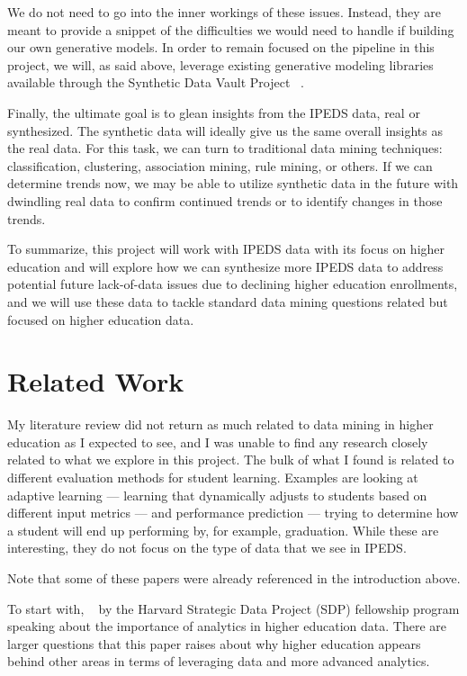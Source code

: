\documentclass[sigconf, authorversion, nonacm]{acmart}
\begin{document}
    We do not need to go into the inner workings of these issues. Instead, they are meant to provide a snippet of the difficulties we would need to handle if building our own generative models. In order to remain focused on the pipeline in this project, we will, as said above, leverage existing generative modeling libraries available through the Synthetic Data Vault Project ~\cite{sdv}.

    Finally, the ultimate goal is to glean insights from the IPEDS data, real or synthesized. The synthetic data will ideally give us the same overall insights as the real data. For this task, we can turn to traditional data mining techniques: classification, clustering, association mining, rule mining, or others. If we can determine trends now, we may be able to utilize synthetic data in the future with dwindling real data to confirm continued trends or to identify changes in those trends.

    To summarize, this project will work with IPEDS data with its focus on higher education and will explore how we can synthesize more IPEDS data to address potential future lack-of-data issues due to declining higher education enrollments, and we will use these data to tackle standard data mining questions related but focused on higher education data.

\section{Related Work}
    My literature review did not return as much related to data mining in higher education as I expected to see, and I was unable to find any research closely related to what we explore in this project. The bulk of what I found is related to different evaluation methods for student learning. Examples are looking at adaptive learning --- learning that dynamically adjusts to students based on different input metrics --- and performance prediction --- trying to determine how a student will end up performing by, for example, graduation. While these are interesting, they do not focus on the type of data that we see in IPEDS.

    Note that some of these papers were already referenced in the introduction above.

    To start with, ~\cite{sdp} by the Harvard Strategic Data Project (SDP) fellowship program speaking about the importance of analytics in higher education data. There are larger questions that this paper raises about why higher education appears behind other areas in terms of leveraging data and more advanced analytics.
\end{document}
